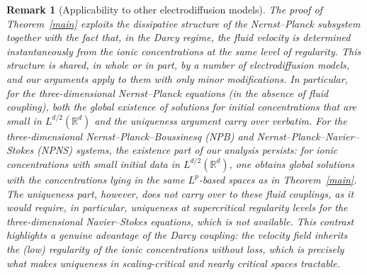 \documentclass[11pt,reqno]{amsart}
\newtheorem{rem}[thm]{Remark}
\begin{document}
\begin{rem}[Applicability to other electrodiffusion models]
\label{rem:other-models}
The proof of Theorem~\ref{main} 
exploits the dissipative structure of the Nernst--Planck subsystem
together with the fact that, in the Darcy regime, the fluid velocity
is determined instantaneously from the ionic concentrations at the
same level of regularity. This structure is shared, in whole or in
part, by a number of electrodiffusion models, and our arguments apply
to them with only minor modifications. In particular, for the
three-dimensional Nernst--Planck equations (in the absence of fluid
coupling), both the global existence of solutions for initial
concentrations that are small in $L^{d/2}(\mathbb{R}^d)$ and the
uniqueness argument carry over
verbatim. For the three-dimensional Nernst--Planck--Boussinesq (NPB)
and Nernst--Planck--Navier--Stokes (NPNS) systems, the existence part
of our analysis persists: for ionic concentrations with small initial
data in $L^{d/2}(\mathbb{R}^d)$, one obtains global solutions with the
concentrations lying in the same $L^p$-based spaces as in
Theorem~\ref{main}. The uniqueness part, however, does not
carry over to these fluid couplings, as it would require, in
particular, uniqueness at supercritical regularity levels for the
three-dimensional Navier--Stokes equations, which is not available.
This contrast highlights a genuine advantage of the Darcy coupling:
the velocity field inherits the (low) regularity of the ionic
concentrations without loss, which is precisely what makes uniqueness
in scaling-critical and nearly critical spaces tractable.
\end{rem}
\end{document}
